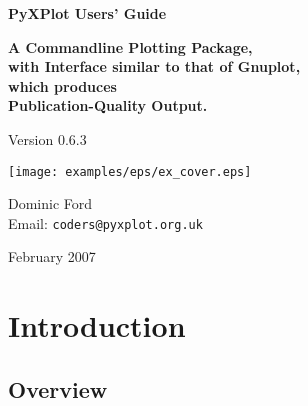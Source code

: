 \documentclass[a4paper,onecolumn,11pt]{book}
\def\version{0.6.3}
\def\reldate{February 2007}
\begin{document}
\begin{titlepage}
\normalsize
\vspace*{0.5cm}
\begin{center}
{\Huge \bf PyXPlot Users' Guide}\\
\end{center}
\vspace*{0.5cm}
\begin{center}
{\LARGE \bf A Commandline Plotting Package, \\ \vspace{2mm} with Interface similar to that of Gnuplot, \\ \vspace{2mm} which produces \\ \vspace{2mm} Publication-Quality Output. \\}
\end{center}
\vspace*{0.5cm}
\begin{center}
{\Large Version \version \\}
\end{center}
\vspace*{0.0cm}
\begin{center}
\texttt{[image: examples/eps/ex\_cover.eps]}
\end{center}
\vspace*{0.0cm}
\begin{center}
{\Large Dominic Ford \\ \vspace{2mm} Email: \noindent \texttt{coders@pyxplot.org.uk} \\ }
\end{center}
\vspace*{0.5cm}
\begin{center}
{\Large \reldate \\}
\end{center}
\end{titlepage}


\tableofcontents

\chapter{Introduction}

\label{introduction}

\section{Overview}
\end{document}
